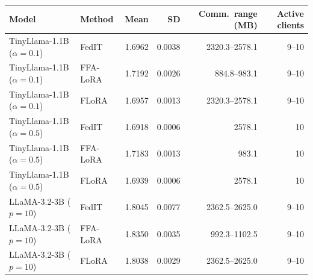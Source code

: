 \begin{tabular}{llrrrr}
\toprule
Model & Method & Mean & SD & Comm.\ range (MB) & Active clients \\
\midrule
TinyLlama-1.1B ($\alpha{=}0.1$) & FedIT & 1.6962 & 0.0038 & 2320.3--2578.1 & 9--10 \\
TinyLlama-1.1B ($\alpha{=}0.1$) & FFA-LoRA & 1.7192 & 0.0026 & 884.8--983.1 & 9--10 \\
TinyLlama-1.1B ($\alpha{=}0.1$) & FLoRA & 1.6957 & 0.0013 & 2320.3--2578.1 & 9--10 \\
TinyLlama-1.1B ($\alpha{=}0.5$) & FedIT & 1.6918 & 0.0006 & 2578.1 & 10 \\
TinyLlama-1.1B ($\alpha{=}0.5$) & FFA-LoRA & 1.7183 & 0.0013 & 983.1 & 10 \\
TinyLlama-1.1B ($\alpha{=}0.5$) & FLoRA & 1.6939 & 0.0006 & 2578.1 & 10 \\
LLaMA-3.2-3B ($p{=}10$) & FedIT & 1.8045 & 0.0077 & 2362.5--2625.0 & 9--10 \\
LLaMA-3.2-3B ($p{=}10$) & FFA-LoRA & 1.8350 & 0.0035 & 992.3--1102.5 & 9--10 \\
LLaMA-3.2-3B ($p{=}10$) & FLoRA & 1.8038 & 0.0029 & 2362.5--2625.0 & 9--10 \\
\bottomrule
\end{tabular}

